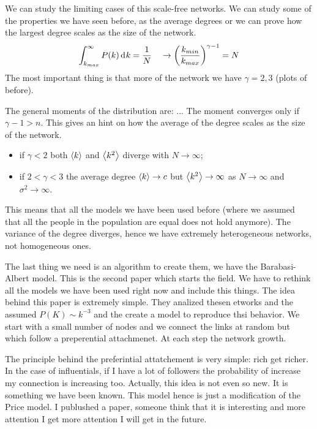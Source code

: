 \documentclass[../main/main.tex]{subfiles}
\begin{document}
We can study the limiting cases of this scale-free networks. We can study some of the properties we have seen before, as the average degrees or we can prove how the largest degree scales as the size of the network.
\begin{equation*}
  \int_{k_{max}}^{\infty } P(k) \dd[]{k}  = \frac{1}{N} \quad \rightarrow  \qty(\frac{k_{min}}{k_{max}})^{\gamma -1 } = N
\end{equation*}
The most important thing is that more of the network we have \( \gamma =2,3  \) (plots of before).

The general moments of the distribution are:
...
The moment converges only if \( \gamma -1 > n  \). This gives an hint on how the average of the degree scales as the size of the network.

\begin{itemize}
\item if \( \gamma <2  \) both \( \expval{k}  \) and \( \expval{k^2}  \) diverge with \( N \rightarrow  \infty  \);

\item if \( 2 < \gamma < 3  \) the average degree \( \expval{k}  \rightarrow c \) but \( \expval{k^2}  \rightarrow \infty \) as \( N \rightarrow  \infty  \) and \( \sigma ^2 \rightarrow \infty  \).
\end{itemize}

This means that all the models we have been used before (where we assumed that all the people in the population are equal does not hold anymore). The variance of the degree diverges, hence we have extremely heterogeneous networks, not homogeneous ones.

The last thing we need is an algorithm to create them, we have the Barabasi-Albert model. This is the second paper which starts the field. We have to rethink all the models we have been used right now and include this things.
The idea behind this paper is extremely simple. They analized thesen etworks and the assumed \( P(K) \sim k^{-3} \) and the create a model to reproduce thsi behavior. We start with a small number of nodes and we connect the links at random but which follow a preperential attachmenet. At each step the network growth.

The principle behind the preferintial attatchement is very simple: rich get richer. In the case of influentials, if I have a lot of followers the probability of increase my connection is increasing too. Actually, this idea is not even so new. It is something we have been known. This model hence is just a modification of the Price model. I publushed a paper, someone think that it is interesting and more attention I get more attention I will get in the future.
\end{document}
